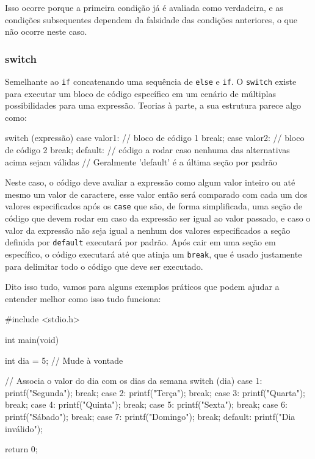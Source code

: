 Isso ocorre porque a primeira condição já é avaliada como verdadeira, e as 
condições subsequentes dependem da falsidade das condições anteriores, o que 
não ocorre neste caso.

\subsubsection{switch}

Semelhante ao \texttt{if} concatenando uma sequência de \texttt{else} e \texttt{if}. 
O \texttt{switch} existe para executar um bloco de código específico em um cenário de 
múltiplas possibilidades para uma expressão. Teorias à parte, a sua estrutura parece 
algo como:

\begin{excode}
    switch (expressão) {
        case valor1:  
            // bloco de código 1
            break;
        case valor2:
            // bloco de código 2
            break;
        default:
            // código a rodar caso nenhuma das alternativas acima sejam válidas
            // Geralmente 'default' é a última seção por padrão
    }
\end{excode}

Neste caso, o código deve avaliar a expressão como algum valor inteiro ou até mesmo 
um valor de caractere, esse valor então será comparado com cada um dos valores 
especificados após os \texttt{case} que são, de forma simplificada, uma seção de 
código que devem rodar em caso da expressão ser igual ao valor passado, e caso o 
valor da expressão não seja igual a nenhum dos valores especificados a seção 
definida por \texttt{default} executará por padrão. Após cair em uma seção em 
específico, o código executará até que atinja um \texttt{break}, que é usado 
justamente para delimitar todo o código que deve ser executado.

Dito isso tudo, vamos para alguns exemplos práticos que podem ajudar a entender melhor como 
isso tudo funciona:

\begin{excode}
    #include <stdio.h>

    int main(void)
    {
        int dia = 5; // Mude à vontade

        // Associa o valor do dia com os dias da semana
        switch (dia) {
            case 1:
                printf("Segunda\n");
                break;
            case 2:
                printf("Terça\n");
                break;
            case 3:
                printf("Quarta\n");
                break;
            case 4:
                printf("Quinta\n");
                break;
            case 5:
                printf("Sexta\n");
                break;
            case 6:
                printf("Sábado\n");
                break;
            case 7:
                printf("Domingo\n");
                break;
            default:
                printf("Dia inválido\n");
        }

        return 0;
    }
\end{excode}

